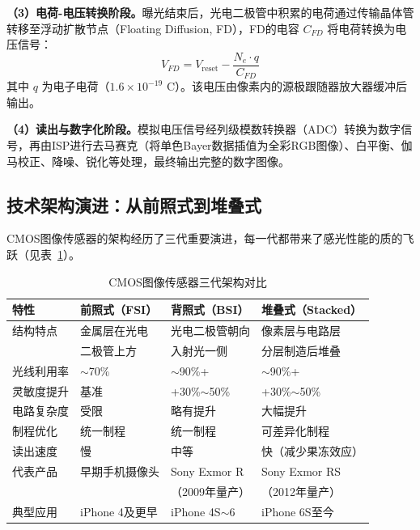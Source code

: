 \documentclass[12pt, a4paper]{ctexart}
\begin{document}
\textbf{（3）电荷-电压转换阶段。}曝光结束后，光电二极管中积累的电荷通过传输晶体管转移至浮动扩散节点（Floating Diffusion, FD），FD的电容 $C_{FD}$ 将电荷转换为电压信号：
\begin{equation}
    V_{FD} = V_{\text{reset}} - \frac{N_e \cdot q}{C_{FD}}
\end{equation}
其中 $q$ 为电子电荷（$1.6 \times 10^{-19}$ C）。该电压由像素内的源极跟随器放大器缓冲后输出。

\textbf{（4）读出与数字化阶段。}模拟电压信号经列级模数转换器（ADC）转换为数字信号，再由ISP进行去马赛克（将单色Bayer数据插值为全彩RGB图像）、白平衡、伽马校正、降噪、锐化等处理，最终输出完整的数字图像。

\subsection{技术架构演进：从前照式到堆叠式}

CMOS图像传感器的架构经历了三代重要演进，每一代都带来了感光性能的质的飞跃（见表~\ref{tab:cmos_evolution}）。

\begin{table}[H]
\centering
\caption{CMOS图像传感器三代架构对比}
\label{tab:cmos_evolution}
\small
\begin{tabular}{llll}
\toprule
\textbf{特性} & \textbf{前照式（FSI）} & \textbf{背照式（BSI）} & \textbf{堆叠式（Stacked）} \\
\midrule
结构特点 & 金属层在光电 & 光电二极管朝向 & 像素层与电路层 \\
 & 二极管上方 & 入射光一侧 & 分层制造后堆叠 \\
\midrule
光线利用率 & $\sim$70\% & $\sim$90\%+ & $\sim$90\%+ \\
\midrule
灵敏度提升 & 基准 & +30\%$\sim$50\% & +30\%$\sim$50\% \\
\midrule
电路复杂度 & 受限 & 略有提升 & 大幅提升 \\
\midrule
制程优化 & 统一制程 & 统一制程 & 可差异化制程 \\
\midrule
读出速度 & 慢 & 中等 & 快（减少果冻效应） \\
\midrule
代表产品 & 早期手机摄像头 & Sony Exmor R & Sony Exmor RS \\
 & & （2009年量产） & （2012年量产） \\
\midrule
典型应用 & iPhone 4及更早 & iPhone 4S$\sim$6 & iPhone 6S至今 \\
\bottomrule
\end{tabular}
\end{table}
\end{document}
